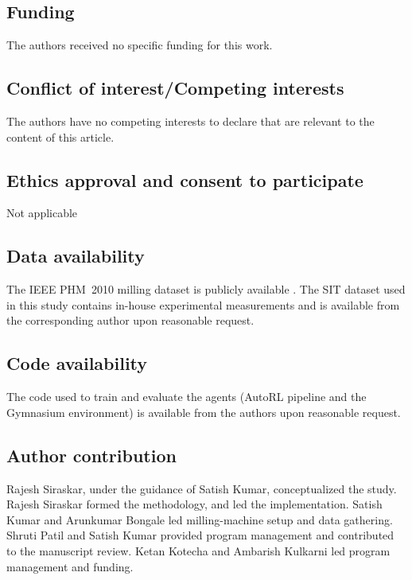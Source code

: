 \documentclass[sn-basic]{sn-jnl}%
\begin{document}
\subsection*{Funding}
The authors received no specific funding for this work.

\subsection*{Conflict of interest/Competing interests}
The authors have no competing interests to declare that are relevant to the content of this article.

\subsection*{Ethics approval and consent to participate}
Not applicable

\subsection*{Data availability}
The IEEE PHM~2010 milling dataset is publicly available \cite{PHMdata2010}. The SIT dataset used in this study contains in-house experimental measurements and is available from the corresponding author upon reasonable request.

\subsection*{Code availability}
The code used to train and evaluate the agents (AutoRL pipeline and the Gymnasium environment) is available from the authors upon reasonable request.

\subsection*{Author contribution}
Rajesh Siraskar, under the guidance of Satish Kumar, conceptualized the study. Rajesh Siraskar formed the methodology, and led the implementation. Satish Kumar and Arunkumar Bongale led milling-machine setup and data gathering. Shruti Patil and Satish Kumar provided program management and contributed to the manuscript review. Ketan Kotecha and Ambarish Kulkarni led program management and funding.
\end{document}
